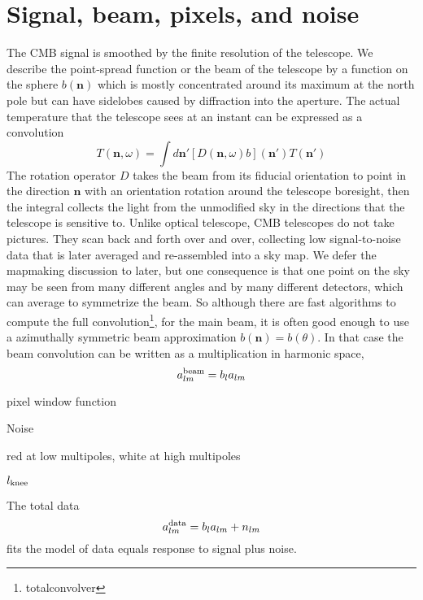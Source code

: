 \section{Signal, beam, pixels, and noise}

The CMB signal is smoothed by the finite resolution of the telescope.  We describe the point-spread function or the beam of the telescope by a function on the sphere $b(\mathbf{n})$ which is mostly concentrated around its maximum at the north pole but can have sidelobes caused by diffraction into the aperture.  The actual temperature that the telescope sees at an instant can be expressed as a convolution
\begin{equation}
  T(\mathbf{n},\omega) = \int d\mathbf{n}' [D(\mathbf{n},\omega)b](\mathbf{n}') T(\mathbf{n}')
\end{equation}
The rotation operator $D$ takes the beam from its fiducial orientation to point in the direction $\mathbf{n}$ with an orientation rotation around the telescope boresight, then the integral collects the light from the unmodified sky in the directions that the telescope is sensitive to.  Unlike optical telescope, CMB telescopes do not take pictures.  They scan back and forth over and over, collecting low signal-to-noise data that is later averaged and re-assembled into a sky map.  We defer the mapmaking discussion to later, but one consequence is that one point on the sky may be seen from many different angles and by many different detectors, which can average to symmetrize the beam.  So although there are fast algorithms to compute the full convolution\footnote{totalconvolver}, for the main beam, it is often good enough to use a azimuthally symmetric beam approximation $b(\mathbf{n}) = b(\theta)$.  In that case the beam convolution can be written as a multiplication in harmonic space,
\begin{equation}
  a_{lm}^{\rm beam} = b_l a_{lm}
\end{equation}

pixel window function


Noise

red at low multipoles, white at high multipoles

$l_{\rm knee}$

The total data 
\begin{equation}
  a^{\rm data}_{lm} = b_l a_{lm} + n_{lm}
\end{equation}
fits the model of data equals response to signal plus noise.





